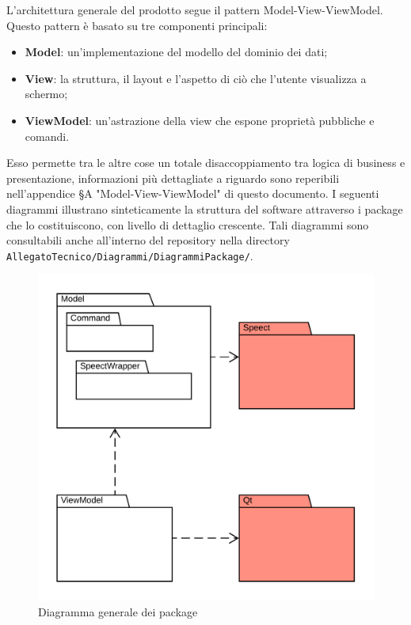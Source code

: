 \documentclass[openany,12pt,a4paper]{report}
\begin{document}
	L'architettura generale del prodotto segue il pattern Model-View-ViewModel. Questo pattern è basato su tre componenti principali:
	
	\begin{itemize}
		\item \textbf{Model}: un'implementazione del modello del dominio dei dati;
		\item \textbf{View}: la struttura, il layout e l'aspetto di ciò che l'utente visualizza a schermo;
		\item \textbf{ViewModel}: un'astrazione della view che espone proprietà pubbliche e comandi.
	\end{itemize}
	
	\noindent Esso permette tra le altre cose un totale disaccoppiamento tra logica di business e presentazione, informazioni più dettagliate a riguardo sono reperibili nell'appendice §A "Model-View-ViewModel" di questo documento. I seguenti diagrammi illustrano sinteticamente la struttura del software attraverso i package che lo costituiscono, con livello di dettaglio crescente. Tali diagrammi sono consultabili anche all'interno del repository nella directory \verb|AllegatoTecnico/Diagrammi/DiagrammiPackage/|. 
	
	\newpage
	
	\begin{figure}[H]
		\includegraphics[scale=1.4]{PackageDiagram1}
		\centering
		\caption{Diagramma generale dei package}
	\end{figure}
	
\end{document}

